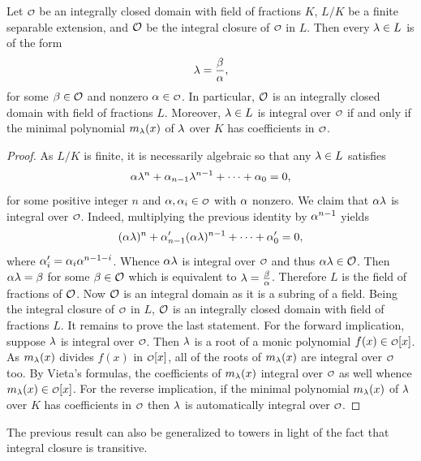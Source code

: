     \begin{proposition}\label{prop:field_of_fractions_AKBL}
      Let \(\smc{O}\) be an integrally closed domain with field of fractions \(K\), \(L/K\) be a finite separable extension, and \(\mathcal{O}\) be the integral closure of \(\smc{O}\) in \(L\). Then every \(\lambda \in L\) is of the form
      \[
        \lambda = \frac{\beta}{\alpha},
      \]
      for some \(\beta \in \mathcal{O}\) and nonzero \(\a \in \smc{O}\). In particular, \(\mathcal{O}\) is an integrally closed domain with field of fractions \(L\). Moreover, \(\lambda \in L\) is integral over \(\smc{O}\) if and only if the minimal polynomial \(m_{\lambda}(x)\) of \(\lambda\) over \(K\) has coefficients in \(\smc{O}\).
    \end{proposition}
    \begin{proof}
      As \(L/K\) is finite, it is necessarily algebraic so that any \(\lambda \in L\) satisfies
      \[
        \alpha\lambda^{n}+\alpha_{n-1}\lambda^{n-1}+\cdots+\alpha_{0} = 0,
      \]
      for some positive integer \(n\) and \(\a,\a_{i} \in \smc{O}\) with \(\alpha\) nonzero. We claim that \(\alpha\lambda\) is integral over \(\smc{O}\). Indeed, multiplying the previous identity by \(\alpha^{n-1}\) yields
      \[
        (\alpha\lambda)^{n}+\alpha'_{n-1}(\alpha\lambda)^{n-1}+\cdots+\alpha'_{0} = 0,
      \]
      where \(\alpha'_{i} = \alpha_{i}\alpha^{n-1-i}\). Whence \(\alpha\lambda\) is integral over \(\smc{O}\) and thus \(\alpha\lambda \in \mathcal{O}\). Then \(\alpha\lambda = \beta\) for some \(\beta \in \mathcal{O}\) which is equivalent to \(\lambda = \frac{\beta}{\alpha}\). Therefore \(L\) is the field of fractions of \(\mathcal{O}\). Now \(\mathcal{O}\) is an integral domain as it is a subring of a field. Being the integral closure of \(\smc{O}\) in \(L\), \(\mathcal{O}\) is an integrally closed domain with field of fractions \(L\). It remains to prove the last statement. For the forward implication, suppose \(\lambda\) is integral over \(\smc{O}\). Then \(\lambda\) is a root of a monic polynomial \(f(x) \in \smc{O}[x]\). As \(m_{\lambda}(x)\) divides \(f(x)\) in \(\smc{O}[x]\), all of the roots of \(m_{\lambda}(x)\) are integral over \(\smc{O}\) too. By Vieta's formulas, the coefficients of \(m_{\lambda}(x)\) integral over \(\smc{O}\) as well whence \(m_{\l}(x) \in \smc{O}[x]\). For the reverse implication, if the minimal polynomial \(m_{\lambda}(x)\) of \(\lambda\) over \(K\) has coefficients in \(\smc{O}\) then \(\lambda\) is automatically integral over \(\smc{O}\).
    \end{proof}

    The previous result can also be generalized to towers in light of the fact that integral closure is transitive.

